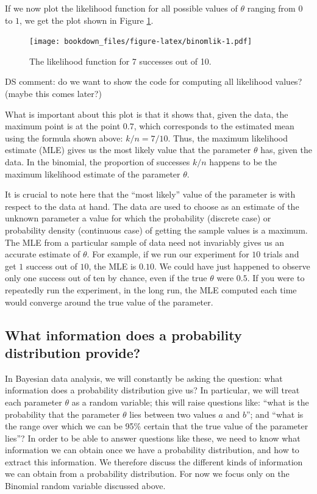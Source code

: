 \documentclass[12pt,]{krantz}
\makeatletter
\newenvironment{kframe}{%
\medskip{}
\setlength{\fboxsep}{.8em}
 \def\at@end@of@kframe{}%
 \ifinner\ifhmode%
  \def\at@end@of@kframe{\end{minipage}}%
  \begin{minipage}{\columnwidth}%
 \fi\fi%
 \def\FrameCommand##1{\hskip\@totalleftmargin \hskip-\fboxsep
 \colorbox{shadecolor}{##1}\hskip-\fboxsep
     \hskip-\linewidth \hskip-\@totalleftmargin \hskip\columnwidth}%
 \MakeFramed {\advance\hsize-\width
   \@totalleftmargin\z@ \linewidth\hsize
   \@setminipage}}%
 {\par\unskip\endMakeFramed%
 \at@end@of@kframe}
\newenvironment{rmdblock}[1]
  {
  \begin{itemize}
  \renewcommand{\labelitemi}{
    \raisebox{-.7\height}[0pt][0pt]{
      {\setkeys{Gin}{width=3em,keepaspectratio}\texttt{[image: images/\#1]}}
    }
  }
  \setlength{\fboxsep}{1em}
  \begin{kframe}
  \item
  }
  {
  \end{kframe}
  \end{itemize}
  }
\newenvironment{rmdnote}
  {\begin{rmdblock}{note}}
  {\end{rmdblock}}
\theoremstyle{definition}
\theoremstyle{definition}
\theoremstyle{definition}
\theoremstyle{remark}
\makeatother
\begin{document}
If we now plot the likelihood function for all possible values of
\(\theta\) ranging from \(0\) to \(1\), we get the plot shown in Figure
\ref{fig:binomlik}.

\begin{figure}
\centering
\texttt{[image: bookdown\_files/figure-latex/binomlik-1.pdf]}
\caption{\label{fig:binomlik}The likelihood function for 7 successes out of
10.}
\end{figure}

\begin{rmdnote} DS comment: do we want to show the code for
computing all likelihood values? (maybe this comes later?)
\end{rmdnote}

What is important about this plot is that it shows that, given the data,
the maximum point is at the point \(0.7\), which corresponds to the
estimated mean using the formula shown above: \(k/n = 7/10\). Thus, the
maximum likelihood estimate (MLE) gives us the most likely value that
the parameter \(\theta\) has, given the data. In the binomial, the
proportion of successes \(k/n\) happens to be the maximum likelihood
estimate of the parameter \(\theta\).

It is crucial to note here that the ``most likely'' value of the
parameter is with respect to the data at hand. The data are used to
choose as an estimate of the unknown parameter a value for which the
probability (discrete case) or probability density (continuous case) of
getting the sample values is a maximum. The MLE from a particular sample
of data need not invariably gives us an accurate estimate of \(\theta\).
For example, if we run our experiment for \(10\) trials and get \(1\)
success out of \(10\), the MLE is \(0.10\). We could have just happened
to observe only one success out of ten by chance, even if the true
\(\theta\) were \(0.5\). If you were to repeatedly run the experiment,
in the long run, the MLE computed each time would converge around the
true value of the parameter.

\subsection{What information does a probability distribution
provide?}\label{what-information-does-a-probability-distribution-provide}

In Bayesian data analysis, we will constantly be asking the question:
what information does a probability distribution give us? In particular,
we will treat each parameter \(\theta\) as a random variable; this will
raise questions like: ``what is the probability that the parameter
\(\theta\) lies between two values \(a\) and \(b\)''; and ``what is the
range over which we can be 95\% certain that the true value of the
parameter lies''? In order to be able to answer questions like these, we
need to know what information we can obtain once we have a probability
distribution, and how to extract this information. We therefore discuss
the different kinds of information we can obtain from a probability
distribution. For now we focus only on the Binomial random variable
discussed above.
\end{document}
